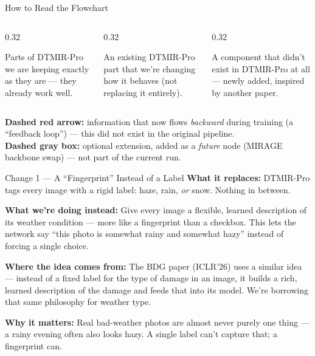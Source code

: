 \documentclass[11pt]{beamer}
\begin{document}
\begin{frame}{How to Read the Flowchart}
\begin{columns}[T]
\begin{column}{0.32\textwidth}
\vspace{2mm}
Parts of DTMIR-Pro we are keeping exactly as they are --- they already work well.
\end{column}
\begin{column}{0.32\textwidth}
\vspace{2mm}
An existing DTMIR-Pro part that we're changing how it behaves (not replacing it entirely).
\end{column}
\begin{column}{0.32\textwidth}
\vspace{2mm}
A component that didn't exist in DTMIR-Pro at all --- newly added, inspired by another paper.
\end{column}
\end{columns}
\vspace{3mm}
\textcolor{red!70!black}{\bf Dashed red arrow:} information that now flows \emph{backward}
during training (a ``feedback loop'') --- this did not exist in the original pipeline.\\[2mm]
\small \textbf{Dashed gray box:} optional extension, added as a
\emph{future} node (MIRAGE backbone swap) --- not part of the current run.
\end{frame}

\begin{frame}{Change 1 --- A ``Fingerprint'' Instead of a Label}
\textbf{What it replaces:} DTMIR-Pro tags every image with a rigid label: haze,
rain, \emph{or} snow. Nothing in between.

\vspace{3mm}
\textbf{What we're doing instead:} Give every image a flexible, learned description
of its weather condition --- more like a fingerprint than a checkbox. This lets the
network say ``this photo is somewhat rainy and somewhat hazy'' instead of forcing a
single choice.

\vspace{3mm}
\textbf{Where the idea comes from:} The BDG paper (ICLR'26) uses a similar idea ---
instead of a fixed label for the type of damage in an image, it builds a rich,
learned description of the damage and feeds that into its model. We're borrowing
that same philosophy for weather type.

\vspace{3mm}
\textbf{Why it matters:} Real bad-weather photos are almost never purely one thing
--- a rainy evening often also looks hazy. A single label can't capture that; a
fingerprint can.
\end{frame}
\end{document}
